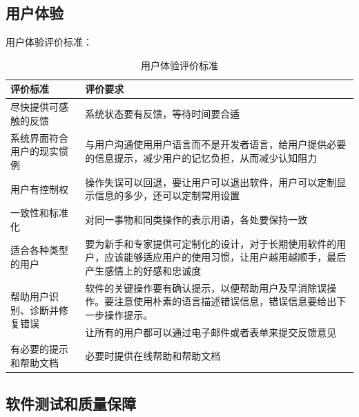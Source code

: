 \subsection{用户体验}
用户体验评价标准：
\begin{table}[H]
  \centering
  \caption{用户体验评价标准}
    \begin{tabular}{|p{8.335em}|p{17.665em}|}
    \hline
    \textcolor[rgb]{ .298,  .282,  .239}{评价标准} & \textcolor[rgb]{ .298,  .282,  .239}{评价要求} \\
    \hline
    \textcolor[rgb]{ .298,  .282,  .239}{尽快提供可感触的反馈} & \textcolor[rgb]{ .298,  .282,  .239}{系统状态要有反馈，等待时间要合适} \\
    \hline
    \textcolor[rgb]{ .298,  .282,  .239}{系统界面符合用户的现实惯例} & \textcolor[rgb]{ .298,  .282,  .239}{与用户沟通使用用户语言而不是开发者语言，给用户提供必要的信息提示，减少用户的记忆负担，从而减少认知阻力} \\
    \hline
    \textcolor[rgb]{ .298,  .282,  .239}{用户有控制权} & \textcolor[rgb]{ .298,  .282,  .239}{操作失误可以回退，要让用户可以退出软件，用户可以定制显示信息的多少，还可以定制常用设置} \\
    \hline
    \textcolor[rgb]{ .298,  .282,  .239}{一致性和标准化} & \textcolor[rgb]{ .298,  .282,  .239}{对同一事物和同类操作的表示用语，各处要保持一致} \\
    \hline
    \textcolor[rgb]{ .298,  .282,  .239}{适合各种类型的用户} & \textcolor[rgb]{ .298,  .282,  .239}{要为新手和专家提供可定制化的设计，对于长期使用软件的用户，应该能够适应用户的使用习惯，让用户越用越顺手，最后产生感情上的好感和忠诚度} \\
    \hline
    \multirow{2}[2]{*}{\textcolor[rgb]{ .298,  .282,  .239}{帮助用户识别、诊断并修复错误}} & \textcolor[rgb]{ .298,  .282,  .239}{软件的关键操作要有确认提示，以便帮助用户及早消除误操作。要注意使用朴素的语言描述错误信息，错误信息要给出下一步操作提示。} \\
    \multicolumn{1}{|c|}{} & \textcolor[rgb]{ .298,  .282,  .239}{让所有的用户都可以通过电子邮件或者表单来提交反馈意见} \\
    \hline
    \textcolor[rgb]{ .298,  .282,  .239}{有必要的提示和帮助文档} & \textcolor[rgb]{ .298,  .282,  .239}{必要时提供在线帮助和帮助文档} \\
    \hline
    \end{tabular}%
  \label{tab:yhty}%
\end{table}%


\subsection{软件测试和质量保障}

